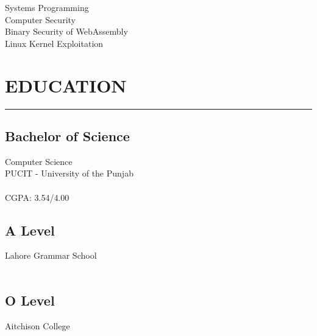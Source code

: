 \documentclass[]{resume}
\begin{document}
%
%

\begin{minipage}[t]{0.33\textwidth}

    \begin{large}
        \\
    \end{large}

    \vspace{4pt}
    \noindent {}\\
    Systems Programming\\
    Computer Security\\
    Binary Security of WebAssembly\\
    Linux Kernel Exploitation



    \section{EDUCATION}
    \noindent\rule{5cm}{0.4pt}

    \subsection{Bachelor of Science}
    \noindent Computer Science\\
    PUCIT - University of the Punjab\\
    \\
    CGPA: 3.54/4.00

    \vspace{8pt}
    \subsection{A Level}
    \noindent Lahore Grammar School\\
    \\

    \vspace{8pt}
    \subsection{O Level}
    \noindent Aitchison College\\
    \\


\end{minipage}
\end{document}
